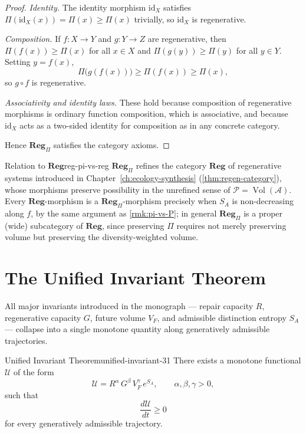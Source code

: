 \documentclass[12pt,twoside,openright]{book}
\newcommand{\adm}{\mathcal{A}}
\newcommand{\Vol}{\operatorname{Vol}}
\begin{document}
\begin{proof}
  \emph{Identity.} The identity morphism $\mathrm{id}_X$
  satisfies $\Pi(\mathrm{id}_X(x)) = \Pi(x) \ge \Pi(x)$
  trivially, so $\mathrm{id}_X$ is regenerative.

  \emph{Composition.} If $f:X\to Y$ and $g:Y\to Z$ are
  regenerative, then $\Pi(f(x))\ge\Pi(x)$ for all $x\in X$
  and $\Pi(g(y))\ge\Pi(y)$ for all $y\in Y$. Setting
  $y=f(x)$,
  \[
    \Pi\bigl(g(f(x))\bigr) \ge \Pi(f(x)) \ge \Pi(x),
  \]
  so $g\circ f$ is regenerative.

  \emph{Associativity and identity laws.} These hold because
  composition of regenerative morphisms is ordinary function
  composition, which is associative, and because
  $\mathrm{id}_X$ acts as a two-sided identity for
  composition as in any concrete category.

  Hence $\mathbf{Reg}_\Pi$ satisfies the category axioms.
\end{proof}

\begin{remark}{Relation to $\mathbf{Reg}$}{reg-pi-vs-reg}
  $\mathbf{Reg}_\Pi$ refines the category $\mathbf{Reg}$ of
  regenerative systems introduced in
  Chapter~\ref{ch:ecology-synthesis} (\cref{thm:regen-category}), whose
  morphisms preserve possibility in the unrefined sense of
  $\mathcal{P}=\Vol(\adm)$. Every $\mathbf{Reg}$-morphism is
  a $\mathbf{Reg}_\Pi$-morphism precisely when $S_A$ is
  non-decreasing along $f$, by the same argument as
  \cref{rmk:pi-vs-P}; in general $\mathbf{Reg}_\Pi$ is a
  proper (wide) subcategory of $\mathbf{Reg}$, since
  preserving $\Pi$ requires not merely preserving volume but
  preserving the diversity-weighted volume.
\end{remark}

\section{The Unified Invariant Theorem}
\label{sec:ch31-unified}

All major invariants introduced in the monograph --- repair
capacity $R$, regenerative capacity $G$, future volume
$V_F$, and admissible distinction entropy $S_A$ --- collapse
into a single monotone quantity along generatively
admissible trajectories.

\begin{theorem}{Unified Invariant Theorem}{unified-invariant-31}
  There exists a monotone functional $\mathcal{U}$ of the
  form
  \[
    \mathcal{U} = R^\alpha\, G^\beta\, V_F^\gamma\, e^{S_A},
    \qquad \alpha,\beta,\gamma > 0,
  \]
  such that
  \[
    \frac{d\mathcal{U}}{dt} \ge 0
  \]
  for every generatively admissible trajectory.
\end{theorem}
\end{document}
